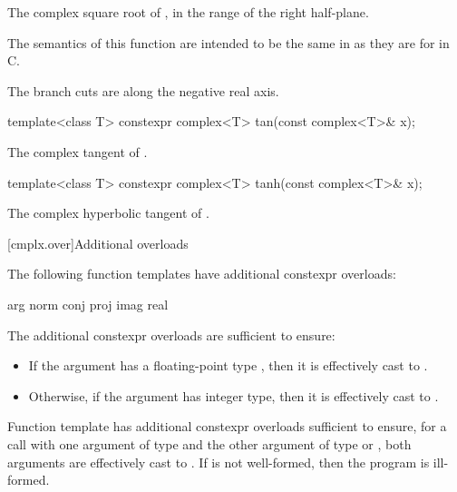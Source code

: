 \begin{itemdescr}
\pnum
\returns
The complex square root of , in the range of the right
half-plane.
\begin{note}
The semantics of this function are intended to be the same in \Cpp{}
as they are for  in C.
\end{note}

\pnum
\remarks
The branch cuts are along the negative real axis.
\end{itemdescr}

%
\begin{itemdecl}
template<class T> constexpr complex<T> tan(const complex<T>& x);
\end{itemdecl}

\begin{itemdescr}
\pnum
\returns
The complex tangent of .
\end{itemdescr}

%
\begin{itemdecl}
template<class T> constexpr complex<T> tanh(const complex<T>& x);
\end{itemdecl}

\begin{itemdescr}
\pnum
\returns
The complex hyperbolic tangent of .
\end{itemdescr}

[cmplx.over]{Additional overloads}

\pnum
{}%
%
%
%
%
The following function templates have additional constexpr overloads:
\begin{codeblock}
arg                   norm
conj                  proj
imag                  real
\end{codeblock}

\pnum
{}%
The additional constexpr overloads are sufficient to ensure:
\begin{itemize}
\item
If the argument has a floating-point type ,
then it is effectively cast to .
\item
Otherwise, if the argument has integer type,
then it is effectively cast to .
\end{itemize}

\pnum
{}%
Function template  has additional constexpr overloads sufficient to ensure,
for a call with one argument of type  and
the other argument of type  or ,
both arguments are effectively cast to .
If  is not well-formed,
then the program is ill-formed.

